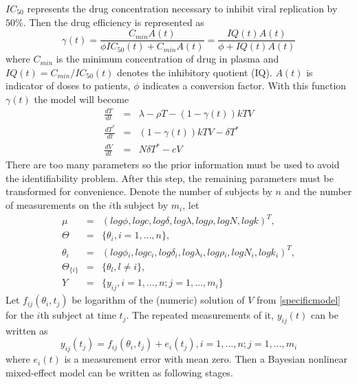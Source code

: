 \documentclass[12pt]{extarticle}
\begin{document}
$IC_{50}$ represents the drug concentration necessary to inhibit viral replication by $50\%$. Then the drug efficiency is represented as
\begin{equation}
\gamma{}(t)=\frac{C_{min}A(t)}{\phi{}IC_{50}(t)+C_{min}A(t)}=\frac{IQ(t)A(t)}{\phi{}+IQ(t)A(t)}
\end{equation}
where $C_{min}$ is the minimum concentration of drug in plasma and $IQ(t)=C_{min}/IC_{50}(t)$ denotes  the inhibitory quotient (IQ). $A(t)$ is indicator of doses to patients, $\phi$ indicates a conversion factor. With this function $\gamma{}(t)$ the model will become
\begin{equation}
\begin{array}{rcl}
\frac{dT}{dt} & = & \lambda{}-\rho{}T-(1-\gamma{}(t))kTV \\
\frac{dT^{*}}{dt} & = & (1-\gamma{}(t))kTV-\delta{}T^{*} \\
\frac{dV}{dt} & = & N\delta{}T^{*}-cV  \label{specificmodel}
\end{array}
\end{equation}
There are too many parameters so the prior information must be used to avoid the identifiability problem. After this step, the remaining parameters must be transformed for convenience. Denote the number of subjects by $n$ and the number of measurements on the $i$th subject by $m_i$, let
\begin{equation}
\begin{array}{rcl}
\mu & = & (log\phi{},logc,log\delta{},log\lambda{},log\rho{},logN,logk)^{T}, \\
\Theta & = & \{\theta_{i},i=1,\ldots,n\}, \\
\theta_{i} & = & (log\phi{}_{i},logc_{i},log\delta{}_{i},log\lambda{}_{i},log\rho{}_{i},logN_{i},logk_{i})^{T}, \\
\Theta_{\{i\}} & = & \{\theta_{l},l\neq{}i\}, \\
Y & = & \{y_{ij},i=1,\ldots,n;j=1,\ldots,m_{i}\}
\end{array}
\end{equation}
Let $f_{ij}(\theta_{i},t_{j})$ be logarithm of the (numeric) solution of $V$ from \eqref{specificmodel} for the $i$th subject at time $t_j$. The repeated measurements of it, $y_{ij}(t)$ can be written as
\begin{equation}
y_{ij}(t_{j})=f_{ij}(\theta_{i},t_{j})+e_{i}(t_{j}), i=1,\ldots,n;j=1,\ldots,m_{i}
\end{equation}
where $e_{i}(t)$ is a measurement error with mean zero. Then a Bayesian nonlinear mixed-effect model can be written as following stages.
\end{document}

